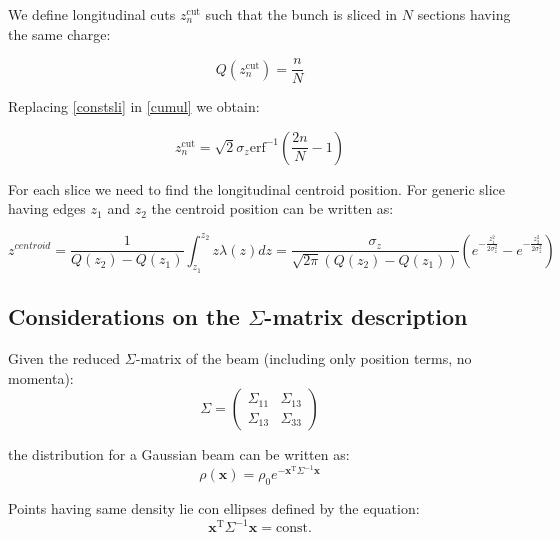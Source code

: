 \begin{appendices}
We define longitudinal cuts $z^{\mathrm{cut}}_n$ such that the bunch is sliced in $N$ sections having the same charge:

\begin{equation}
Q(z^{\mathrm{cut}}_n) = \frac{n}{N}
\label{constsli}
\end{equation}

Replacing \ref{constsli} in \ref{cumul} we obtain:

\begin{equation}
z^{\mathrm{cut}}_n = \sqrt{2} \sigma_z \mathrm{erf}^{-1}\left( \frac{2n}{N}-1\right)
\end{equation}

For each slice we need to find the longitudinal centroid position. For generic slice having edges $z_1$ and $z_2$ the centroid position can be written as:

\begin{equation}
z^{centroid}= \frac{1}{Q(z_2) - Q(z_1)}\int_{z_1}^{z_2} z \lambda(z)dz = \frac{\sigma_z}{\sqrt{2\pi}\left(Q(z_2) - Q(z_1)\right)}\left(e^{-\frac{z_1^2}{2\sigma_z^2}}-e^{-\frac{z_2^2}{2\sigma_z^2}}\right)
\end{equation}

\subsection{Considerations on the $\Sigma$-matrix description}
\label{app:sigma}

Given the reduced $\Sigma$-matrix of the beam (including only position terms, no momenta):
\begin{equation}
\Sigma = \left(
\begin{matrix}
{\Sigma}_{11} & {\Sigma}_{13}\\
{\Sigma}_{13} & {\Sigma}_{33}
\end{matrix}
\right)
\end{equation}



 the distribution for a Gaussian beam can be written as:
\begin{equation}
\rho(\textbf{x}) = \rho_0 e^{-\textbf{x}^{\mathrm{T}} \Sigma^{-1}\textbf{x}}
\end{equation}

Points having same density lie con ellipses defined by the equation:
\begin{equation}
\textbf{x}^\mathrm{T}\Sigma^{-1}\textbf{x} = \mathrm{const.}
\label{eqellipse2}
\end{equation}


\end{appendices}
